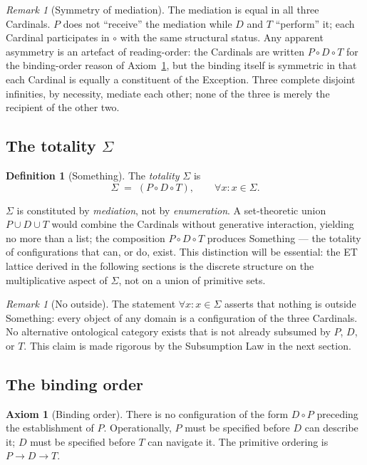 \documentclass[11pt,a4paper]{article}
\theoremstyle{definition}
\newtheorem{definition}[theorem]{Definition}
\newtheorem{axiom}[theorem]{Axiom}
\theoremstyle{remark}
\newtheorem{remark}[theorem]{Remark}
\begin{document}
\begin{remark}[Symmetry of mediation]\label{rem:mediation-symmetry}
The mediation is equal in all three Cardinals. $P$ does not ``receive'' the mediation while $D$ and $T$ ``perform'' it; each Cardinal participates in $\circ$ with the same structural status. Any apparent asymmetry is an artefact of reading-order: the Cardinals are written $P \circ D \circ T$ for the binding-order reason of Axiom~\ref{ax:order}, but the binding itself is symmetric in that each Cardinal is equally a constituent of the Exception. Three complete disjoint infinities, by necessity, mediate each other; none of the three is merely the recipient of the other two.
\end{remark}

\subsection{The totality $\Sigma$}\label{subsec:Sigma}

\begin{definition}[Something]\label{def:Sigma}
The \emph{totality} $\Sigma$ is
\[
\Sigma \;=\; (P \circ D \circ T), \qquad \forall x: x \in \Sigma.
\]
\end{definition}

$\Sigma$ is constituted by \emph{mediation}, not by \emph{enumeration}. A set-theoretic union $P \cup D \cup T$ would combine the Cardinals without generative interaction, yielding no more than a list; the composition $P \circ D \circ T$ produces Something --- the totality of configurations that can, or do, exist. This distinction will be essential: the ET lattice derived in the following sections is the discrete structure on the multiplicative aspect of $\Sigma$, not on a union of primitive sets.

\begin{remark}[No outside]
The statement $\forall x : x \in \Sigma$ asserts that nothing is outside Something: every object of any domain is a configuration of the three Cardinals. No alternative ontological category exists that is not already subsumed by $P$, $D$, or $T$. This claim is made rigorous by the Subsumption Law in the next section.
\end{remark}

\subsection{The binding order}

\begin{axiom}[Binding order]\label{ax:order}
There is no configuration of the form $D \circ P$ preceding the establishment of $P$. Operationally, $P$ must be specified before $D$ can describe it; $D$ must be specified before $T$ can navigate it. The primitive ordering is $P \to D \to T$.
\end{axiom}
\end{document}
